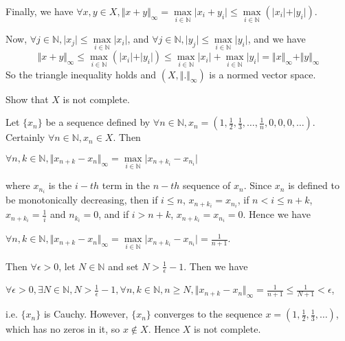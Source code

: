 \documentclass[12pt,a4paper]{article}
\begin{document}
	Finally, we have $\forall x,y \in X, \Vert x+y \Vert_{\infty} = \underset{i \in \mathbb{N}}{\max} \vert x_i + y_i \vert \leq \underset{i \in \mathbb{N}}{\max} \left( \vert x_i \vert + \vert y_i \vert \right)$.
	
	\noindent Now, $\forall j \in \mathbb{N}, \vert x_j \vert \leq \underset{i \in \mathbb{N}}{\max} \vert x_i \vert$, and $\forall j \in \mathbb{N}, \vert y_j \vert \leq \underset{i \in \mathbb{N}}{\max} \vert y_i \vert$, and we have 
	$$\Vert x+y \Vert_{\infty} \le \underset{i \in \mathbb{N}}{\max} \left( \vert x_i \vert + \vert y_i \vert \right) \le \underset{i \in \mathbb{N}}{\max} \vert x_i \vert + \underset{i \in \mathbb{N}}{\max} \vert y_i \vert = \Vert x \Vert_{\infty} + \Vert y \Vert_{\infty}$$
	So the triangle inequality holds and $(X, \Vert . \Vert_{\infty})$ is a normed vector space.
	
	
\begin{ques}
	Show that $X$ is not complete.
\end{ques}
	
	Let $\{x_n\}$ be a sequence defined by $\forall n \in \mathbb{N}, x_n = (1, \frac{1}{2}, \frac{1}{3}, \ldots, \frac{1}{n}, 0,0,0,\ldots)$. Certainly $\forall n \in \mathbb{N}, x_n \in X$. Then
	
	\noindent$\forall n,k \in \mathbb{N}, \Vert x_{n+k} - x_n \Vert_{\infty} = \underset{i \in \mathbb{N}}{\max} \vert x_{n+k_i} - x_{n_i} \vert$
	
	\noindent where $x_{n_i}$ is the $i-th$ term in the $n-th$ sequence of $x_n$. Since $x_n$ is defined to be monotonically decreasing, then if $i\le n$, $x_{n+k_i} = x_{n_i}$, if $n < i \le n+k$, $x_{n+k_i} = \frac{1}{i}$ and $n_{k_i} = 0$, and if $i > n+k$, $x_{n+k_i} = x_{n_i} = 0$. Hence we have
	
	\noindent $\forall n,k \in \mathbb{N}, \Vert x_{n+k} - x_n \Vert_{\infty} = \underset{i \in \mathbb{N}}{\max} \vert x_{n+k_i} - x_{n_i} \vert = \frac{1}{n+1}$.
	
	\noindent Then $\forall \epsilon > 0$, let $N \in \mathbb{N}$ and set $N > \frac{1}{\epsilon} - 1$. Then we have
	
	\noindent $\forall \epsilon > 0, \exists N \in \mathbb{N}, N > \frac{1}{\epsilon} - 1, \forall n,k \in \mathbb{N}, n \ge N, \Vert x_{n+k} - x_{n} \Vert_{\infty} = \frac{1}{n+1} \leq \frac{1}{N+1} < \epsilon$,
	
	\noindent i.e. $\{x_n\}$ is Cauchy. However, $\{x_n\}$ converges to the sequence $x = (1,\frac{1}{2},\frac{1}{3},\ldots)$, which has no zeros in it, so $x \not\in X$. Hence $X$ is not complete.
	
\end{document}
